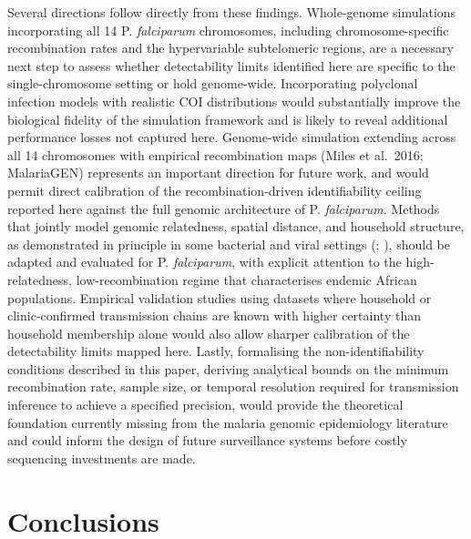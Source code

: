 \documentclass[
  11pt,
]{article}
\begin{document}
Several directions follow directly from these findings. Whole-genome
simulations incorporating all 14 P. \emph{falciparum} chromosomes,
including chromosome-specific recombination rates and the hypervariable
subtelomeric regions, are a necessary next step to assess whether
detectability limits identified here are specific to the
single-chromosome setting or hold genome-wide. Incorporating polyclonal
infection models with realistic COI distributions would substantially
improve the biological fidelity of the simulation framework and is
likely to reveal additional performance losses not captured here.
Genome-wide simulation extending across all 14 chromosomes with
empirical recombination maps (Miles et al.~2016; MalariaGEN) represents
an important direction for future work, and would permit direct
calibration of the recombination-driven identifiability ceiling reported
here against the full genomic architecture of P. \emph{falciparum}.
Methods that jointly model genomic relatedness, spatial distance, and
household structure, as demonstrated in principle in some bacterial and
viral settings (;
), should be adapted and
evaluated for P. \emph{falciparum}, with explicit attention to the
high-relatedness, low-recombination regime that characterises endemic
African populations. Empirical validation studies using datasets where
household or clinic-confirmed transmission chains are known with higher
certainty than household membership alone would also allow sharper
calibration of the detectability limits mapped here. Lastly, formalising
the non-identifiability conditions described in this paper, deriving
analytical bounds on the minimum recombination rate, sample size, or
temporal resolution required for transmission inference to achieve a
specified precision, would provide the theoretical foundation currently
missing from the malaria genomic epidemiology literature and could
inform the design of future surveillance systems before costly
sequencing investments are made.

\section{Conclusions}\label{conclusions}
\end{document}

